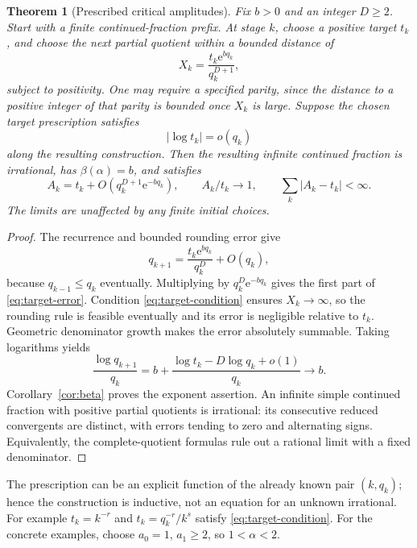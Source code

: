\documentclass[11pt,a4paper]{article}
\numberwithin{equation}{section}
\newtheorem{theorem}{Theorem}[section]
\theoremstyle{definition}
\theoremstyle{remark}
\newcommand{\e}{\mathrm e}
\begin{document}
\begin{theorem}[Prescribed critical amplitudes]
\label{thm:construction}
Fix $b>0$ and an integer $D\ge2$. Start with a finite continued-fraction
prefix. At stage $k$, choose a positive target $t_k$, and choose the next
partial quotient within a bounded distance of
\begin{equation}
 X_k=\frac{t_k\e^{bq_k}}{q_k^{D+1}},
 \label{eq:target-quotient}
\end{equation}
subject to positivity. One may require a specified parity, since the
distance to a positive integer of that parity is bounded once $X_k$ is
large. Suppose the chosen target prescription satisfies
\begin{equation}
 |\log t_k|=o(q_k)
 \label{eq:target-condition}
\end{equation}
along the resulting construction. Then the resulting infinite continued
fraction is irrational, has $\beta(\alpha)=b$, and satisfies
\begin{equation}
 A_k=t_k+O(q_k^{D+1}\e^{-bq_k}),\qquad
 A_k/t_k\longrightarrow1,\qquad
 \sum_k|A_k-t_k|<\infty.
 \label{eq:target-error}
\end{equation}
The limits are unaffected by any finite initial choices.
\end{theorem}
\begin{proof}
The recurrence and bounded rounding error give
\[
 q_{k+1}=\frac{t_k\e^{bq_k}}{q_k^D}+O(q_k),
\]
because $q_{k-1}\le q_k$ eventually. Multiplying by
$q_k^D\e^{-bq_k}$ gives the first part of \eqref{eq:target-error}.
Condition \eqref{eq:target-condition} ensures $X_k\to\infty$, so the
rounding rule is feasible eventually and its error is negligible
relative to $t_k$. Geometric denominator growth makes the error
absolutely summable. Taking logarithms yields
\[
 \frac{\log q_{k+1}}{q_k}
   =b+\frac{\log t_k-D\log q_k+o(1)}{q_k}\longrightarrow b.
\]
Corollary~\ref{cor:beta} proves the exponent assertion. An infinite
simple continued fraction with positive partial quotients is irrational:
its consecutive reduced convergents are distinct, with errors tending
to zero and alternating signs. Equivalently, the complete-quotient
formulas rule out a rational limit with a fixed denominator.
\end{proof}

The prescription can be an explicit function of the already known pair
$(k,q_k)$; hence the construction is inductive, not an equation for an
unknown irrational. For example $t_k=k^{-r}$ and
$t_k=q_k^{-r}/k^s$ satisfy \eqref{eq:target-condition}. For the concrete
examples, choose $a_0=1$, $a_1\ge2$, so $1<\alpha<2$.
\end{document}
